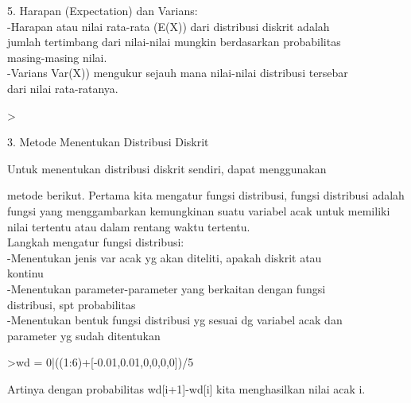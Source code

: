 \documentclass[a4paper,10pt]{article}
\begin{document}
\begin{eulernotebook}
\begin{eulercomment}
\begin{eulercomment}
\begin{eulercomment}
\begin{eulercomment}
\begin{eulercomment}
\begin{eulercomment}
\begin{eulercomment}
\begin{eulercomment}
\begin{eulercomment}
\begin{eulercomment}
\begin{eulerttcomment}
\end{eulerttcomment}
\begin{eulercomment}
5. Harapan (Expectation) dan Varians:\\
-Harapan atau nilai rata-rata (E(X)) dari distribusi diskrit adalah\\
jumlah tertimbang dari nilai-nilai mungkin berdasarkan probabilitas\\
masing-masing nilai.\\
-Varians Var(X)) mengukur sejauh mana nilai-nilai distribusi tersebar\\
dari nilai rata-ratanya.

\end{eulercomment}
\begin{eulerprompt}
> 
\end{eulerprompt}
\eulersubheading{}
\begin{eulercomment}
3. Metode Menentukan Distribusi Diskrit

\end{eulercomment}
\begin{eulerttcomment}
      Untuk menentukan distribusi diskrit sendiri, dapat menggunakan
\end{eulerttcomment}
\begin{eulercomment}
metode berikut. Pertama kita mengatur fungsi distribusi, fungsi
distribusi adalah fungsi yang menggambarkan kemungkinan suatu variabel
acak untuk memiliki nilai tertentu atau dalam rentang waktu tertentu.\\
Langkah mengatur fungsi distribusi:\\
-Menentukan jenis var acak yg akan diteliti, apakah diskrit atau\\
kontinu\\
-Menentukan parameter-parameter yang berkaitan dengan fungsi\\
distribusi, spt probabilitas\\
-Menentukan bentuk fungsi distribusi yg sesuai dg variabel acak dan\\
parameter yg sudah ditentukan
\end{eulercomment}
\begin{eulerprompt}
>wd = 0|((1:6)+[-0.01,0.01,0,0,0,0])/5
\end{eulerprompt}
\begin{euleroutput}
  [0,  0.198,  0.402,  0.6,  0.8,  1,  1.2]
\end{euleroutput}
\begin{eulercomment}
Artinya dengan probabilitas wd[i+1]-wd[i] kita menghasilkan nilai acak
i.


\end{eulercomment}
\end{eulercomment}
\end{eulercomment}
\end{eulercomment}
\end{eulercomment}
\end{eulercomment}
\end{eulercomment}
\end{eulercomment}
\end{eulercomment}
\end{eulercomment}
\end{eulercomment}
\end{eulernotebook}
\end{document}
